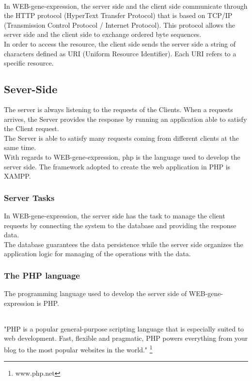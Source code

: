 \documentclass[a4paper]{report}
\begin{document}
\\In WEB-gene-expression, the server side and the client side communicate through the HTTP protocol (HyperText Transfer Protocol) that is based on TCP/IP (Transmission Control Protocol / Internet Protocol). This protocol allows the server side and the client side to exchange ordered byte sequences.
\\In order to access the resource, the client side sends the server side a string of characters defined as URI (Uniform Resource Identifier). Each URI refers to a specific resource.

\subsection{Sever-Side}\label{serverside}

The server is always listening to the requests of the Clients. When a requests arrives, the Server provides the response by running an application able to satisfy the Client request.\\
The Server is able to satisfy many requests coming from different clients at the same time.\\
With regards to WEB-gene-expression, php is the language used to develop the server side. The framework adopted to create the web application in PHP is XAMPP.


\subsubsection{Server Tasks} 
In WEB-gene-expression, the server side has the task to manage the client requests by connecting the system to the database and providing the response data. \\
The database guarantees the data persistence while the server side organizes the application logic for managing of the operations with the data.\\

\subsubsection{The PHP language}\label{php}

The programming language used to develop the server side of WEB-gene-expression is PHP. 

\\"PHP is a popular general-purpose scripting language that is especially suited to web development. Fast, flexible and pragmatic, PHP powers everything from your blog to the most popular websites in the world." \footnote{www.php.net}
\end{document}
